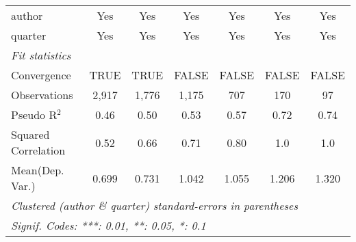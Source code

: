 \begin{tabular}{lcccccc}
   author                                                     & Yes          & Yes           & Yes           & Yes           & Yes           & Yes\\  
   quarter                                                    & Yes          & Yes           & Yes           & Yes           & Yes           & Yes\\  
   \midrule
   \emph{Fit statistics}\\
   Convergence                                                &TRUE          & TRUE          & FALSE         & FALSE         & FALSE         & FALSE\\  
   Observations                                               & 2,917        & 1,776         & 1,175         & 707           & 170           & 97\\  
   Pseudo R$^2$                                               & 0.46         & 0.50          & 0.53          & 0.57          & 0.72          & 0.74\\  
   Squared Correlation                                        & 0.52         & 0.66          & 0.71          & 0.80          & 1.0           & 1.0\\  
Mean(Dep. Var.) & 0.699 & 0.731 & 1.042 & 1.055 & 1.206 & 1.320 \\
   \midrule \midrule
   \multicolumn{7}{l}{\emph{Clustered (author \& quarter) standard-errors in parentheses}}\\
   \multicolumn{7}{l}{\emph{Signif. Codes: ***: 0.01, **: 0.05, *: 0.1}}\\
\end{tabular}
\par\endgroup
